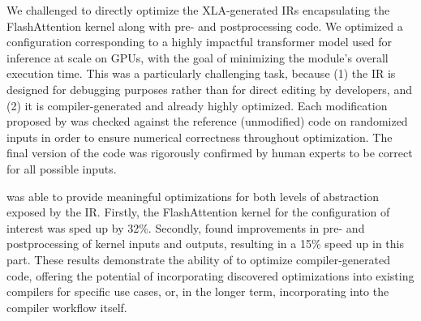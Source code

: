 We challenged \method to directly optimize the XLA-generated IRs encapsulating the FlashAttention kernel along with pre- and postprocessing code. We optimized a configuration corresponding to a highly impactful transformer model used for inference at scale on GPUs, with the goal of minimizing the module's overall execution time. This was a particularly challenging task, because (1) the IR is designed for debugging purposes rather than for direct editing by developers, and (2) it is compiler-generated and already highly optimized. Each modification proposed by \method was checked against the reference (unmodified) code on randomized inputs in order to ensure numerical correctness throughout optimization. The final version of the code was rigorously confirmed by human experts to be correct for all possible inputs.

\method was able to provide meaningful optimizations for both levels of abstraction exposed by the IR. Firstly, the FlashAttention kernel for the configuration of interest was sped up by 32\%. Secondly, \method found improvements in pre- and postprocessing of kernel inputs and outputs, resulting in a 15\% speed up in this part. These results demonstrate the ability of \method to optimize compiler-generated code, offering the potential of incorporating discovered optimizations into existing compilers for specific use cases, or, in the longer term, incorporating \method into the compiler workflow itself.
